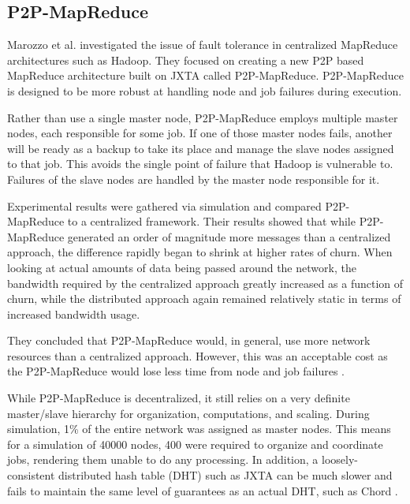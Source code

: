 \documentclass[10pt, conference, compsocconf]{IEEEtran}
\begin{document}
\subsection{P2P-MapReduce}
Marozzo et al. \cite{marozzo2012p2p} investigated the issue of fault tolerance in centralized MapReduce architectures such as Hadoop.  They focused on creating a new P2P based MapReduce architecture built on JXTA \cite{935182} called P2P-MapReduce.  P2P-MapReduce is designed to be more robust at handling node and job failures during execution.

Rather than use a single master node, P2P-MapReduce employs multiple master nodes, each responsible for some job.  If one of those master nodes fails, another will be ready as a backup to take its place and manage the slave nodes assigned to that job.  This avoids the single point of failure that Hadoop is vulnerable to. Failures of the slave nodes are handled by the master node responsible for it.

Experimental results were gathered via simulation and compared P2P-MapReduce to a centralized framework. Their results showed that while P2P-MapReduce generated an order of magnitude more messages than a centralized approach, the difference rapidly began to shrink at higher rates of churn.  When looking at actual amounts of data being passed around the network, the bandwidth required by the centralized approach greatly increased as a function of churn, while the distributed approach again remained relatively static in terms of increased bandwidth usage.  

They concluded that P2P-MapReduce would, in general, use more network resources than a centralized approach. However, this was an acceptable cost as the P2P-MapReduce would lose less time from node and job failures \cite{marozzo2012p2p}.

While P2P-MapReduce is decentralized, it still relies on a very definite master/slave hierarchy for organization, computations, and scaling. 
During simulation, 1\% of the entire network was assigned as master nodes. This means for a simulation of 40000 nodes, 400 were required to organize and coordinate jobs, rendering them unable to do any processing.  In addition, a loosely-consistent  distributed hash table (DHT) such as JXTA can be much slower and fails to maintain the same level of guarantees as an actual DHT, such as Chord \cite{5359174}.   


\end{document}
